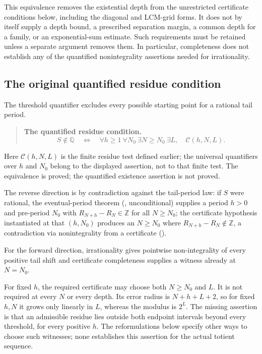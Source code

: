 This equivalence removes the existential depth from the unrestricted
certificate conditions below, including the diagonal and LCM-grid forms.
It does not by itself supply a depth bound, a prescribed separation
margin, a common depth for a family, or an exponential-sum estimate.
Such requirements must be retained unless a separate argument removes
them. In particular, completeness does not establish any of the
quantified nonintegrality assertions needed for irrationality.

\subsection{The original quantified residue condition}

The threshold quantifier excludes every possible starting point for
a rational tail period.

\begin{quote}

\textbf{The quantified residue condition.}
\[
  S\notin\mathbb Q
  \quad\Longleftrightarrow\quad
  \forall h\ge1\ \forall N_0\ \exists N\ge N_0\ \exists L,
  \quad\mathcal C(h,N,L).
\]
\end{quote}
Here $\mathcal C(h,N,L)$ is the finite residue test defined earlier;
the universal quantifiers over $h$ and $N_0$ belong to the displayed
assertion, not to that finite test.
The equivalence is proved; the quantified existence assertion is not proved.

The reverse direction is by contradiction against the tail-period law: if $S$ were
rational, the eventual-period theorem
(,
unconditional) supplies a period $h>0$ and pre-period $N_0$ with
$R_{N+h}-R_N\in\mathbb{Z}$ for all $N\ge N_0$; the certificate hypothesis
instantiated at that $(h,N_0)$ produces an $N\ge N_0$ where
$R_{N+h}-R_N\notin\mathbb{Z}$, a contradiction via nonintegrality from a certificate
().

For the forward direction, irrationality gives pointwise non-integrality of
every positive tail shift and certificate completeness supplies a witness
already at $N=N_0$.


For fixed $h$, the required certificate may choose both $N\ge N_0$ and
$L$. It is not required at every $N$ or every depth. Its error radius
is $N+h+L+2$, so for fixed $h,N$ it grows only linearly in $L$, whereas
the modulus is $2^L$. The missing assertion is that an admissible
residue lies outside both endpoint intervals beyond every threshold,
for every positive $h$. The reformulations below specify other ways
to choose such witnesses; none establishes this assertion for the
actual totient sequence.


